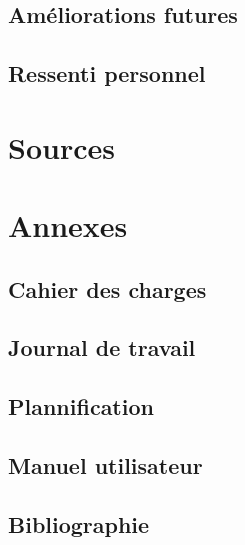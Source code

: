 \documentclass[a4paper,10pt,openany,oneside]{sphinxmanual}
\begin{document}
\section{Améliorations futures}
\label{index:ameliorations-futures}

\section{Ressenti personnel}
\label{index:ressenti-personnel}

\chapter{Sources}
\label{index:sources}

\chapter{Annexes}
\label{index:annexes}

\section{Cahier des charges}
\label{index:cahier-des-charges}

\section{Journal de travail}
\label{index:id13}

\section{Plannification}
\label{index:plannification}

\section{Manuel utilisateur}
\label{index:manuel-utilisateur}

\section{Bibliographie}
\label{index:bibliographie}


\renewcommand{\indexname}{Index}
\printindex
\end{document}
